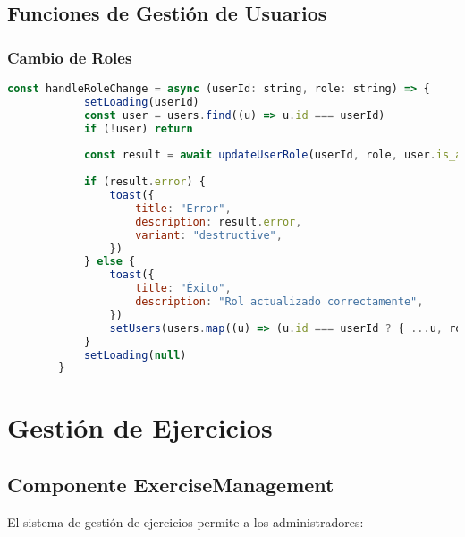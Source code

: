 \documentclass[12pt,a4paper]{article}
\begin{document}
	\subsection{Funciones de Gestión de Usuarios}
	
	\subsubsection{Cambio de Roles}
	\begin{lstlisting}[language=JavaScript, caption=Función handleRoleChange]
		const handleRoleChange = async (userId: string, role: string) => {
			setLoading(userId)
			const user = users.find((u) => u.id === userId)
			if (!user) return
			
			const result = await updateUserRole(userId, role, user.is_active, user.is_professional)
			
			if (result.error) {
				toast({
					title: "Error",
					description: result.error,
					variant: "destructive",
				})
			} else {
				toast({
					title: "Éxito",
					description: "Rol actualizado correctamente",
				})
				setUsers(users.map((u) => (u.id === userId ? { ...u, role } : u)))
			}
			setLoading(null)
		}
	\end{lstlisting}
	
	\section{Gestión de Ejercicios}
	
	\subsection{Componente ExerciseManagement}
	
	El sistema de gestión de ejercicios permite a los administradores:
	
\end{document}
